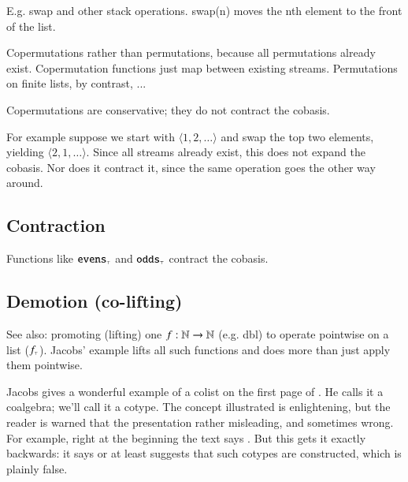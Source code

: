 E.g. swap and other stack operations. swap(n) moves the nth element to
the front of the list.

Copermutations rather than permutations, because all permutations
already exist. Copermutation functions just map between existing
streams.  Permutations on finite lists, by contrast, ...

Copermutations are conservative; they do not contract the cobasis.

For example suppose we start with \(\langle 1,2,\ldots\rangle\) and swap the
top two elements, yielding \(\langle 2,1,\ldots\rangle\). Since all streams
already exist, this does not expand the cobasis. Nor does it contract
it, since the same operation goes the other way around.

\subsection{Contraction}

Functions like \(\texttt{\upshape evens}_{\scriptscriptstyle\top}\) and \(\texttt{\upshape odds}_{\scriptscriptstyle\top}\) contract the
cobasis.

\subsection{Demotion (co-lifting)}

See also: promoting (lifting) one \(f:\mathbb{N}\rightarrow\mathbb{N}\) (e.g. dbl) to
operate pointwise on a list (\(f_{\scriptscriptstyle\top}\)). Jacobs' example lifts all
such functions and does more than just apply them pointwise.

Jacobs gives a wonderful example of a colist on the first page of
\parencite{2017intro_coalgebra}. He calls it a coalgebra; we'll call
it a cotype. The concept illustrated is enlightening, but the reader
is warned that the presentation rather misleading, and sometimes
wrong. For example, right at the beginning the text says
. But this gets it
exactly backwards: it says or at least suggests that such cotypes are
constructed, which is plainly false.

